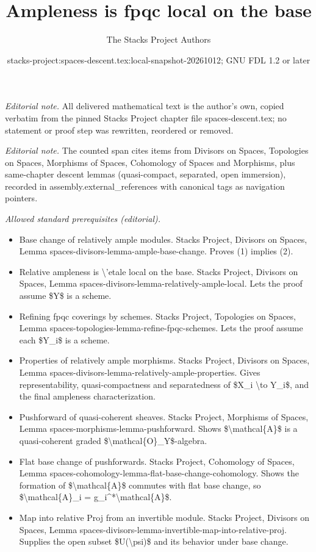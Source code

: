 \documentclass[10pt,a4paper]{amsart}
\title{Ampleness is fpqc local on the base}
\author{The Stacks Project Authors}
\date{stacks-project:spaces-descent.tex:local-snapshot-20261012; GNU FDL 1.2 or later}
\theoremstyle{plain}
\theoremstyle{definition}
\theoremstyle{remark}
\numberwithin{equation}{subsection}
\begin{document}
\maketitle
\noindent\textit{Editorial note.} All delivered mathematical text is the author's own, copied verbatim from the pinned Stacks Project chapter file spaces-descent.tex; no statement or proof step was rewritten, reordered or removed.\par\medskip
\noindent\textit{Editorial note.} The counted span cites items from Divisors on Spaces, Topologies on Spaces, Morphisms of Spaces, Cohomology of Spaces and Morphisms, plus same-chapter descent lemmas (quasi-compact, separated, open immersion), recorded in assembly.external\_references with canonical tags as navigation pointers.\par\medskip
\noindent\textit{Allowed standard prerequisites (editorial).}\begin{itemize}
\item Base change of relatively ample modules. Stacks Project, Divisors on Spaces, Lemma spaces-divisors-lemma-ample-base-change. Proves (1) implies (2).
\item Relative ampleness is \textbackslash{}'etale local on the base. Stacks Project, Divisors on Spaces, Lemma spaces-divisors-lemma-relatively-ample-local. Lets the proof assume \$Y\$ is a scheme.
\item Refining fpqc coverings by schemes. Stacks Project, Topologies on Spaces, Lemma spaces-topologies-lemma-refine-fpqc-schemes. Lets the proof assume each \$Y\_i\$ is a scheme.
\item Properties of relatively ample morphisms. Stacks Project, Divisors on Spaces, Lemma spaces-divisors-lemma-relatively-ample-properties. Gives representability, quasi-compactness and separatedness of \$X\_i \textbackslash{}to Y\_i\$, and the final ampleness characterization.
\item Pushforward of quasi-coherent sheaves. Stacks Project, Morphisms of Spaces, Lemma spaces-morphisms-lemma-pushforward. Shows \$\textbackslash{}mathcal\{A\}\$ is a quasi-coherent graded \$\textbackslash{}mathcal\{O\}\_Y\$-algebra.
\item Flat base change of pushforwards. Stacks Project, Cohomology of Spaces, Lemma spaces-cohomology-lemma-flat-base-change-cohomology. Shows the formation of \$\textbackslash{}mathcal\{A\}\$ commutes with flat base change, so \$\textbackslash{}mathcal\{A\}\_i = g\_i\textasciicircum{}*\textbackslash{}mathcal\{A\}\$.
\item Map into relative Proj from an invertible module. Stacks Project, Divisors on Spaces, Lemma spaces-divisors-lemma-invertible-map-into-relative-proj. Supplies the open subset \$U(\textbackslash{}psi)\$ and its behavior under base change.

\end{itemize}
\end{document}
